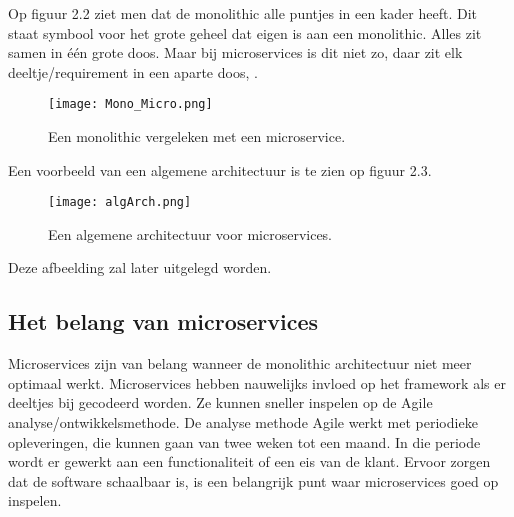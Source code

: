  Op figuur 2.2 ziet men dat de monolithic alle puntjes in een kader heeft. Dit staat symbool voor het grote geheel dat eigen is aan een monolithic. Alles zit samen in één grote doos. Maar bij microservices is dit niet zo, daar zit elk deeltje/requirement in een aparte doos, \textcite{Benetis2016a} . 
\begin{figure}[h!]
	\texttt{[image: Mono\_Micro.png]}
	\centering
	\caption{Een monolithic vergeleken met een microservice. \textcite{Benetis2016a}}
\end{figure}


Een voorbeeld van een algemene architectuur is te zien op figuur 2.3.
\begin{figure}[h!]
	\texttt{[image: algArch.png]}
	\centering
	\caption{Een algemene architectuur voor microservices. \textcite{Koukia2018}}
\end{figure}
Deze afbeelding zal later uitgelegd worden.


\subsection{Het belang van microservices}
Microservices zijn van belang wanneer de monolithic architectuur niet meer optimaal werkt. Microservices hebben nauwelijks invloed op het framework als er deeltjes bij gecodeerd worden. Ze kunnen sneller inspelen op de Agile analyse/ontwikkelsmethode. De analyse methode Agile werkt met periodieke opleveringen, die kunnen gaan van twee weken tot een maand. In die periode wordt er gewerkt aan een functionaliteit of een eis van de klant. 
Ervoor zorgen dat de software schaalbaar is, is een belangrijk punt waar microservices goed op inspelen.



